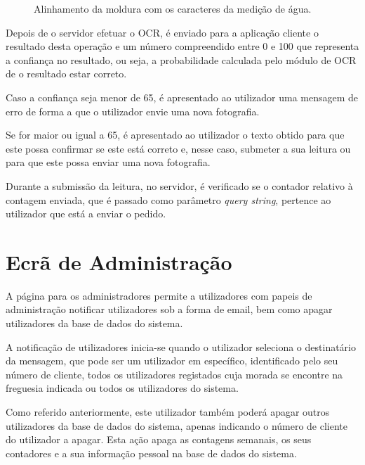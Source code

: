 \begin{figure}[h!]
\begin{center}
\caption{Alinhamento da moldura com os caracteres da medição de água.}
\label{fig:moldura}
\end{center}
\end{figure}

Depois de o servidor efetuar o OCR, é enviado para a aplicação cliente o resultado desta operação e um número compreendido entre 0 e 100 que representa a confiança no resultado, ou seja, a probabilidade calculada pelo módulo de OCR de o resultado estar correto.\par
Caso a confiança seja menor de 65, é apresentado ao utilizador uma mensagem de erro de forma a que o utilizador envie uma nova fotografia.\par
Se for maior ou igual a 65, é apresentado ao utilizador o texto obtido para que este possa confirmar se este está correto e, nesse caso, submeter a sua leitura ou para que este possa enviar uma nova fotografia.\par
Durante a submissão da leitura, no servidor, é verificado se o contador relativo à contagem enviada, que é passado como parâmetro \textit{query string}, pertence ao utilizador que está a enviar o pedido.

\section{Ecrã de Administração} \label{ecra:admin} %
A página para os administradores permite a utilizadores com papeis de administração notificar utilizadores sob a forma de email, bem como apagar utilizadores da base de dados do sistema.\par
A notificação de utilizadores inicia-se quando o utilizador seleciona o destinatário da mensagem, que pode ser um utilizador em específico, identificado pelo seu número de cliente, todos os utilizadores registados cuja morada se encontre na freguesia indicada ou todos os utilizadores do sistema.\par
Como referido anteriormente, este utilizador também poderá apagar outros utilizadores da base de dados do sistema, apenas indicando o número de cliente do utilizador a apagar. Esta ação apaga as contagens semanais, os seus contadores e a sua informação pessoal na base de dados do sistema.


